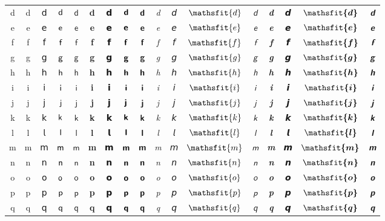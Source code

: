\documentclass[10pt]{standalone}
\newcommand{\SANS}[1]{\ifmmode\mathsf{#1}\else\textsf{#1}\fi}
\newcommand{\BSANS}[1]{\ifmmode\boldsymbol{\mathsf{#1}}\else\textbf{\textsf{#1}}\fi}
\newcommand{\ISANS}[1]{\ifmmode\mathsfit{#1}\else\textit{\textsf{#1}}\fi}
\newcommand{\BISANS}[1]{\ifmmode\bm{\mathsfit{#1}}\else\textbf{\textsf{\textit{#1}}}\fi}
\begin{document}
\begin{tabular}{c|cc|cc|cc|cc|cc|cc|cc|cc}
d & \SANS{d} & 𝖽 & $\SANS{d}$ & $𝖽$ & \BSANS{d} & 𝗱 & $\BSANS{d}$ & $𝗱$ & \ISANS{d} & 𝘥 & $\ISANS{d}$ & $𝘥$ & \BISANS{d} & 𝙙 & $\BISANS{d}$ & $𝙙$ \\
e & \SANS{e} & 𝖾 & $\SANS{e}$ & $𝖾$ & \BSANS{e} & 𝗲 & $\BSANS{e}$ & $𝗲$ & \ISANS{e} & 𝘦 & $\ISANS{e}$ & $𝘦$ & \BISANS{e} & 𝙚 & $\BISANS{e}$ & $𝙚$ \\
f & \SANS{f} & 𝖿 & $\SANS{f}$ & $𝖿$ & \BSANS{f} & 𝗳 & $\BSANS{f}$ & $𝗳$ & \ISANS{f} & 𝘧 & $\ISANS{f}$ & $𝘧$ & \BISANS{f} & 𝙛 & $\BISANS{f}$ & $𝙛$ \\
g & \SANS{g} & 𝗀 & $\SANS{g}$ & $𝗀$ & \BSANS{g} & 𝗴 & $\BSANS{g}$ & $𝗴$ & \ISANS{g} & 𝘨 & $\ISANS{g}$ & $𝘨$ & \BISANS{g} & 𝙜 & $\BISANS{g}$ & $𝙜$ \\
h & \SANS{h} & 𝗁 & $\SANS{h}$ & $𝗁$ & \BSANS{h} & 𝗵 & $\BSANS{h}$ & $𝗵$ & \ISANS{h} & 𝘩 & $\ISANS{h}$ & $𝘩$ & \BISANS{h} & 𝙝 & $\BISANS{h}$ & $𝙝$ \\
i & \SANS{i} & 𝗂 & $\SANS{i}$ & $𝗂$ & \BSANS{i} & 𝗶 & $\BSANS{i}$ & $𝗶$ & \ISANS{i} & 𝘪 & $\ISANS{i}$ & $𝘪$ & \BISANS{i} & 𝙞 & $\BISANS{i}$ & $𝙞$ \\
j & \SANS{j} & 𝗃 & $\SANS{j}$ & $𝗃$ & \BSANS{j} & 𝗷 & $\BSANS{j}$ & $𝗷$ & \ISANS{j} & 𝘫 & $\ISANS{j}$ & $𝘫$ & \BISANS{j} & 𝙟 & $\BISANS{j}$ & $𝙟$ \\
k & \SANS{k} & 𝗄 & $\SANS{k}$ & $𝗄$ & \BSANS{k} & 𝗸 & $\BSANS{k}$ & $𝗸$ & \ISANS{k} & 𝘬 & $\ISANS{k}$ & $𝘬$ & \BISANS{k} & 𝙠 & $\BISANS{k}$ & $𝙠$ \\
l & \SANS{l} & 𝗅 & $\SANS{l}$ & $𝗅$ & \BSANS{l} & 𝗹 & $\BSANS{l}$ & $𝗹$ & \ISANS{l} & 𝘭 & $\ISANS{l}$ & $𝘭$ & \BISANS{l} & 𝙡 & $\BISANS{l}$ & $𝙡$ \\
m & \SANS{m} & 𝗆 & $\SANS{m}$ & $𝗆$ & \BSANS{m} & 𝗺 & $\BSANS{m}$ & $𝗺$ & \ISANS{m} & 𝘮 & $\ISANS{m}$ & $𝘮$ & \BISANS{m} & 𝙢 & $\BISANS{m}$ & $𝙢$ \\
n & \SANS{n} & 𝗇 & $\SANS{n}$ & $𝗇$ & \BSANS{n} & 𝗻 & $\BSANS{n}$ & $𝗻$ & \ISANS{n} & 𝘯 & $\ISANS{n}$ & $𝘯$ & \BISANS{n} & 𝙣 & $\BISANS{n}$ & $𝙣$ \\
o & \SANS{o} & 𝗈 & $\SANS{o}$ & $𝗈$ & \BSANS{o} & 𝗼 & $\BSANS{o}$ & $𝗼$ & \ISANS{o} & 𝘰 & $\ISANS{o}$ & $𝘰$ & \BISANS{o} & 𝙤 & $\BISANS{o}$ & $𝙤$ \\
p & \SANS{p} & 𝗉 & $\SANS{p}$ & $𝗉$ & \BSANS{p} & 𝗽 & $\BSANS{p}$ & $𝗽$ & \ISANS{p} & 𝘱 & $\ISANS{p}$ & $𝘱$ & \BISANS{p} & 𝙥 & $\BISANS{p}$ & $𝙥$ \\
q & \SANS{q} & 𝗊 & $\SANS{q}$ & $𝗊$ & \BSANS{q} & 𝗾 & $\BSANS{q}$ & $𝗾$ & \ISANS{q} & 𝘲 & $\ISANS{q}$ & $𝘲$ & \BISANS{q} & 𝙦 & $\BISANS{q}$ & $𝙦$ \\

\end{tabular}
\end{document}
